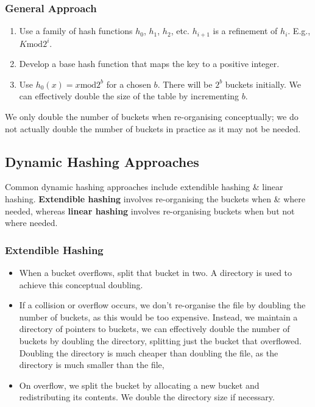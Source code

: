 \documentclass[a4paper,11pt]{article}
\begin{document}
\subsubsection{General Approach}
\begin{enumerate}
    \item   Use a family of hash functions $h_0$, $h_1$, $h_2$, etc.
            $h_{i+1}$ is a refinement of $h_i$.
            E.g., $K \text{mod} 2^i$.
    \item   Develop a base hash function that maps the key to a positive integer.
    \item   Use $h_0(x) = x \text{mod} 2^b$ for a chosen $b$. 
            There will be $2^b$ buckets initially. 
            We can effectively double the size of the table by incrementing $b$.
\end{enumerate}

We only double the number of buckets when re-organising conceptually; we do not actually double the number of 
buckets in practice as it may not be needed.

\subsection{Dynamic Hashing Approaches}
Common dynamic hashing approaches include extendible hashing \& linear hashing.
\textbf{Extendible hashing} involves re-organising the buckets when \& where needed, whereas
\textbf{linear hashing} involves re-organising buckets when but not where needed.

\subsubsection{Extendible Hashing}
\begin{itemize}
    \item   When a bucket overflows, split that bucket in two. A directory is used to achieve this conceptual
            doubling.
    \item   If a collision or overflow occurs, we don't re-organise the file by doubling the number of buckets, 
            as this would be too expensive.
            Instead, we maintain a directory of pointers to buckets, we can effectively double the number of 
            buckets by doubling the directory, splitting just the bucket that overflowed.
            Doubling the directory is much cheaper than doubling the file, as the directory is much smaller than
            the file,
    \item   On overflow, we split the bucket by allocating a new bucket and redistributing its contents.
            We double the directory size if necessary.
\end{itemize}
\end{document}
